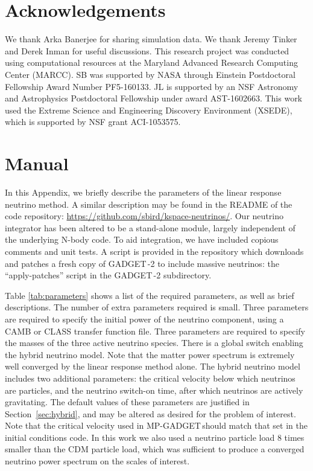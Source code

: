 \documentclass[useAMS, usenatbib]{mnras}
\newcommand{\gadget}{{\small GADGET\,}}
\begin{document}
\section*{Acknowledgements}

We thank Arka Banerjee for sharing simulation data. We thank Jeremy Tinker and Derek Inman for useful discussions.
This research project was conducted using computational resources
at the Maryland Advanced Research Computing Center (MARCC). SB was supported by NASA through
Einstein Postdoctoral Fellowship Award Number PF5-160133. JL is supported by an NSF Astronomy and Astrophysics Postdoctoral Fellowship under award AST-1602663. This work used the Extreme Science and Engineering Discovery Environment (XSEDE), which is supported by NSF grant ACI-1053575.
\appendix

\section{Manual}
\label{sec:manual}

In this Appendix, we briefly describe the parameters of the linear response neutrino method. A similar description may be found in the README of the code repository: \url{https://github.com/sbird/kspace-neutrinos/}. Our neutrino integrator has been altered to be a stand-alone module, largely independent of the underlying N-body code. To aid integration, we have included copious comments and unit tests. A script is provided in the repository which downloads and patches a fresh copy of \gadget-2 to include massive neutrinos: the ``apply-patches'' script in the \gadget-2 subdirectory.

Table \ref{tab:parameters} shows a list of the required parameters, as well as brief descriptions. The number of extra parameters required is small. Three parameters are required to specify the initial power of the neutrino component, using a CAMB or CLASS transfer function file. Three parameters are required to specify the masses of the three active neutrino species.
There is a global switch enabling the hybrid neutrino model. Note that the matter power spectrum is extremely well converged by the linear response method alone. The hybrid neutrino model includes two additional parameters: the critical velocity below which neutrinos are particles, and the neutrino switch-on time, after which neutrinos are actively gravitating. The default values of these parameters are justified in Section~\ref{sec:hybrid}, and may be altered as desired for the problem of interest.
Note that the critical velocity used in MP-\gadget should match that set in the initial conditions code. In this work we also used a neutrino particle load $8$ times smaller than the CDM particle load, which was sufficient to produce a converged neutrino power spectrum on the scales of interest.
\end{document}

